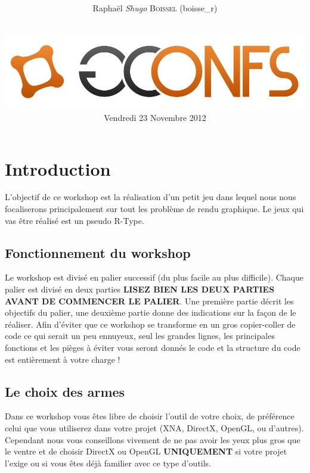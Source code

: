 \documentclass[12pt,a4paper]{report}
\begin{document}
\title{
  \vspace{1cm}
  \textbf{\Huge{\Tp{} \workshoptitle}}\\
}
\author{
  \Large{Raphaël \textit{Shugo} \textsc{Boissel} ({\ttfamily boisse\_r})}\\\\
}

\date{
  \vspace{1cm}
  \includegraphics[scale=0.5]{gconfs.png}\\
  \vspace{0.5cm}
  Vendredi 23 Novembre 2012
}
\maketitle
\newpage
\tableofcontents
\newpage

\chapter{Introduction}
L'objectif de ce workshop est la réalisation d'un petit jeu dans lequel nous
nous focaliserons principalement sur tout les problème de rendu graphique.
Le jeux qui vas être réalisé est un pseudo R-Type.

\section{Fonctionnement du workshop}
Le workshop est divisé en palier successif (du plus facile au plus difficile). Chaque palier est divisé en deux
parties \textbf{ LISEZ  BIEN LES DEUX PARTIES AVANT DE COMMENCER LE PALIER}. Une première partie
décrit les objectifs du palier, une deuxième partie donne des indications sur la façon de le réaliser.
Afin d'éviter que ce workshop se transforme en un gros copier-coller de code ce qui serait un
peu ennuyeux, seul les grandes lignes, les principales fonctions et les pièges à éviter vous seront
donnés le code et la structure du code est entièrement à votre charge !
 

\section{Le choix des armes}
Dans ce workshop vous êtes libre de choisir l'outil de votre choix, de
préférence celui que vous utiliserez dans votre projet (XNA, DirectX, OpenGL, ou d'autres). 
Cependant nous vous conseillons vivement de ne pas avoir les yeux plus gros
que le ventre et de choisir DirectX ou OpenGL  \textbf{UNIQUEMENT} si votre projet l'exige
ou si vous êtes déjà familier avec ce type d'outils.
\end{document}
